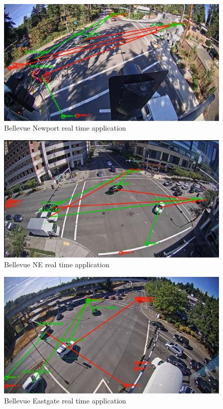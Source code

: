 \documentclass[acmtog, authorversion]{acmart}
\begin{document}
\begin{figure}[H]
    \includegraphics[width=1\columnwidth]{visualization/bellevue_newport.png}
    \caption{Bellevue Newport real time application}
    \label{BellevueNewportRealTime}
\end{figure}

\begin{figure}[H]
    \includegraphics[width=1\columnwidth]{visualization/bellevue_ne.png}
    \caption{Bellevue NE real time application}
    \label{fig: BellevueNERealTime}
\end{figure}

\begin{figure}[H]
    \includegraphics[width=1\columnwidth]{visualization/bellevue_eastgate.png}
    \caption{Bellevue Eastgate real time application}
    \label{fig: BellevueEastgateRealTime}
\end{figure}
\end{document}
